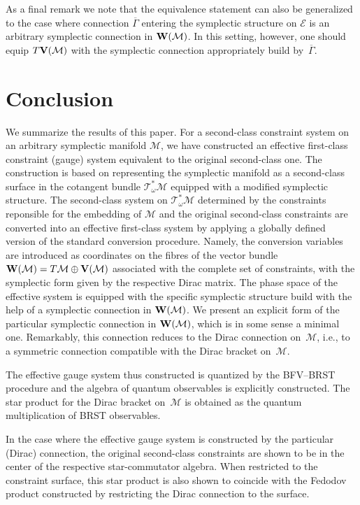 \documentclass[a4paper,11pt]{amsart}
\numberwithin{thm}{section} %
\numberwithin{equation}{section} %
\numberwithin{figure}{section} %
\renewcommand{\:}{{\rm\, :\,}}
\def\bar{\overline}
\def\mod{{\mathcal T}^*_\omega}
\def\manM{{\mathcal M}}
\def\E{{ \mathcal E}}
\def\V{{\bf V}}
\def\W{{\bf W}}
\def\con{{\bar\Gamma}}
\begin{document}
As a final remark we note that the equivalence statement can also be
generalized to the case where connection $\con$ entering the
symplectic structure on $\E$ is an arbitrary symplectic connection in
$\W(\manM)$. In this setting, however, one should equip $T\V(\manM)$
with the symplectic connection appropriately build by~$\con$.


\section{Conclusion}
We summarize the results of this paper.  For a second-class constraint
system on an arbitrary symplectic manifold $\manM$, we have
constructed an effective first-class constraint (gauge) system
equivalent to the original second-class one. The construction is based
on representing the symplectic manifold as a second-class surface in
the cotangent bundle $\mod\manM$ equipped with a modified symplectic
structure.  The second-class system on $\mod\manM$ determined by the
constraints reponsible for the embedding of $\manM$ and the original
second-class constraints are converted into an effective first-class
system by applying a globally defined version of the standard
conversion procedure.  Namely, the conversion variables are introduced
as coordinates on the fibres of the vector bundle
$\W(\manM)=T\manM\oplus \V(\manM)$ associated with the complete set
of constraints, with the symplectic form given by the respective Dirac
matrix.  The phase space of the effective system is equipped with the
specific symplectic structure build with the help of a symplectic
connection in $\W(\manM)$.  We present an explicit form of the
particular symplectic connection in $\W(\manM)$, which is in some
sense a minimal one.  Remarkably, this connection reduces to the Dirac
connection on~$\manM$, i.e., to a symmetric connection compatible with
the Dirac bracket on~$\manM$.

The effective gauge system thus constructed is quantized by the
BFV--BRST procedure and the algebra of quantum observables is
explicitly constructed.  The star product for the Dirac bracket
on~$\manM$ is obtained as the quantum multiplication of  BRST
observables.

In the case where the effective gauge system is constructed by the
particular (Dirac) connection, the original second-class constraints
are shown to be in the center of the respective star-commutator
algebra.  When restricted to the constraint surface, this star product
is also shown to coincide with the Fedodov product constructed by
restricting the Dirac connection to the surface.
\end{document}
